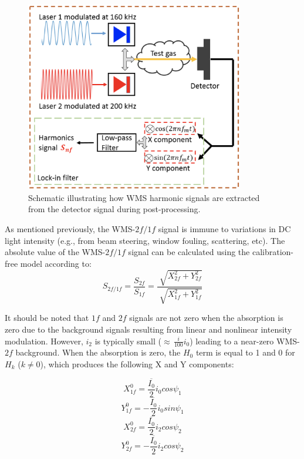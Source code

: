  \begin{figure}[h]
    \centering
        \includegraphics[width=0.85\textwidth]{fig/ch3_fig1_v3.png}
        \caption{Schematic illustrating how WMS harmonic signals are extracted from the detector signal during post-processing.}
    \label{fig:ch3_1}
\end{figure}

As mentioned previously, the WMS-$2f/1f$ signal is immune to variations in DC light intensity (e.g., from beam steering, window fouling, scattering, etc). The absolute value of the WMS-$2f/1f$ signal can be calculated using the calibration-free model according to:
\begin{equation}
S_{2f/1f}=\frac{S_{2f}}{S_{1f}}=\frac{\sqrt[]{X_{2f}^2+Y_{2f}^2}}{\sqrt[]{X_{1f}^2+Y_{1f}^2}}
\end{equation}

It should be noted that $1f$ and $2f$ signals are not zero when the absorption is zero due to the background signals resulting from linear and nonlinear intensity modulation. However, $i_2$ is typically small ($\approx \, \frac{i}{100}i_0$) leading to a near-zero WMS-$2f$ background. When the absorption is zero, the $H_0$ term is equal to 1 and 0 for $H_k$ ($k\neq 0$), which produces the following X and Y components:

\begin{equation}
X_{1f}^0=\frac{\overline{I_0}}{2}i_0cos\psi_1
\end{equation}
\begin{equation}
Y_{1f}^0=-\frac{\overline{I_0}}{2}i_0sin\psi_1
\end{equation}
\begin{equation}
X_{2f}^0=\frac{\overline{I_0}}{2}i_2cos\psi_2
\end{equation}
\begin{equation}
Y_{2f}^0=-\frac{\overline{I_0}}{2}i_2cos\psi_2
\end{equation}

